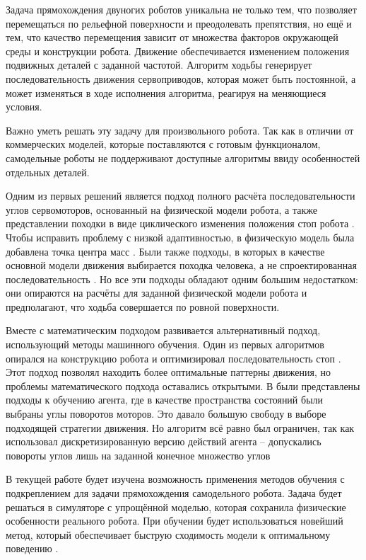 
Задача прямохождения двуногих роботов уникальна не только тем, что позволяет перемещаться по рельефной поверхности и преодолевать препятствия, но ещё и тем, что качество перемещения зависит от множества факторов окружающей среды и конструкции робота. Движение обеспечивается изменением положения подвижных деталей с заданной частотой. Алгоритм ходьбы генерирует последовательность движения сервоприводов, которая может быть постоянной, а может изменяться в ходе исполнения алгоритма, реагируя на меняющиеся условия.

Важно уметь решать эту задачу для произвольного робота. Так как в отличии от коммерческих моделей, которые поставляются с готовым функционалом, самодельные роботы не поддерживают доступные алгоритмы ввиду особенностей отдельных деталей.

Одним из первых решений является подход полного расчёта последовательности углов сервомоторов, основанный на физической модели робота, а также представлении походки в виде циклического изменения положения стоп робота \cite{inverse_1995}. Чтобы исправить проблему с низкой адаптивностью, в физическую модель была добавлена точка центра масс \cite{zmp_1999}. Были также подходы, в которых в качестве основной модели движения выбирается походка человека, а не спроектированная последовательность \cite{human_inspired}. Но все эти подходы обладают одним большим недостатком: они опираются на расчёты для заданной физической модели робота и предполагают, что ходьба совершается по ровной поверхности.

Вместе с математическим подходом развивается альтернативный подход, использующий методы машинного обучения. Один из первых алгоритмов опирался на конструкцию робота и оптимизировал последовательность стоп \cite{stochastic_2004}
. Этот подход позволял находить более оптимальные паттерны движения, но проблемы математического подхода оставались открытыми. В \cite{ml_in_bipedal_2012} были представлены подходы к обучению агента, где в качестве пространства состояний были выбраны углы поворотов моторов. Это давало большую свободу в выборе подходящей стратегии движения. Но алгоритм всё равно был ограничен, так как использовал дискретизированную версию действий агента – допускались повороты углов лишь на заданной конечное множество углов

В текущей работе будет изучена возможность применения методов обучения с подкреплением для задачи прямохождения самодельного робота. Задача будет решаться в симуляторе с упрощённой моделью, которая сохранила физические особенности реального робота. При обучении будет использоваться новейший метод, который обеспечивает быструю сходимость модели к оптимальному поведению \cite{kuznetsov2020controlling}.

